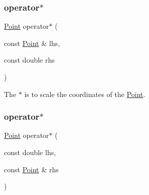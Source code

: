 \subsubsection{\texorpdfstring{operator$\ast$}{operator*}\hspace{0.1cm}{\footnotesize\ttfamily [1/2]}}
{\footnotesize\ttfamily \mbox{\hyperlink{class_jinks_draw_1_1_point}{Point}} operator$\ast$ (\begin{DoxyParamCaption}\item[{const \mbox{\hyperlink{class_jinks_draw_1_1_point}{Point}} \&}]{lhs,  }\item[{const double}]{rhs }\end{DoxyParamCaption})\hspace{0.3cm}{\ttfamily [friend]}}



The $\ast$ is to scale the coordinates of the \mbox{\hyperlink{class_jinks_draw_1_1_point}{Point}}. 


\begin{DoxyCode}{0}
\DoxyCodeLine{}
\DoxyCodeLine{}
\end{DoxyCode}
 \mbox{\label{class_jinks_draw_1_1_point_a143408ed7b4a531fc9c50620a27076b7}} 
\subsubsection{\texorpdfstring{operator$\ast$}{operator*}\hspace{0.1cm}{\footnotesize\ttfamily [2/2]}}
{\footnotesize\ttfamily \mbox{\hyperlink{class_jinks_draw_1_1_point}{Point}} operator$\ast$ (\begin{DoxyParamCaption}\item[{const double}]{lhs,  }\item[{const \mbox{\hyperlink{class_jinks_draw_1_1_point}{Point}} \&}]{rhs }\end{DoxyParamCaption})\hspace{0.3cm}{\ttfamily [friend]}}



